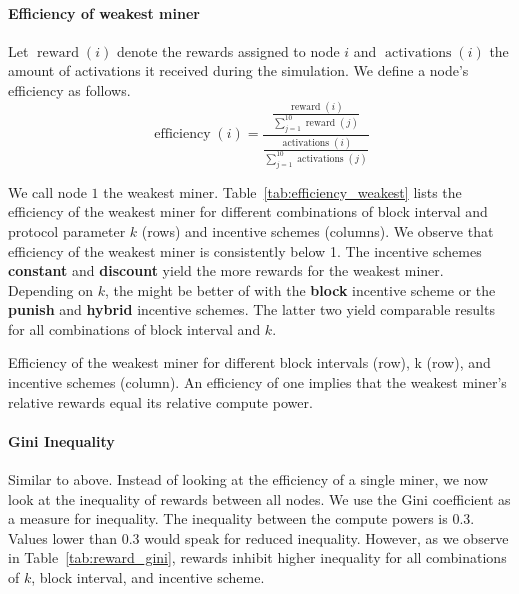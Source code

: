 \documentclass{article}
\begin{document}
\paragraph{Efficiency of weakest miner}

Let $\operatorname{reward}(i)$ denote the rewards assigned to node $i$ and $\operatorname{activations}(i)$ the amount of activations it received during the simulation.
We define a node's efficiency as follows.
\[
  \operatorname{efficiency}(i) =
  \frac{
    \frac{\operatorname{reward}(i)}{\sum_{j=1}^{10}{\operatorname{reward}(j)}}
    }{
    \frac{\operatorname{activations}(i)}{\sum_{j=1}^{10}{\operatorname{activations}(j)}}
  }
\]

We call node $1$ the weakest miner.
Table~\ref{tab:efficiency_weakest} lists the efficiency of the weakest miner for different combinations of block interval and protocol parameter $k$ (rows) and incentive schemes (columns). We observe that efficiency of the weakest miner is consistently below 1. The incentive schemes \textbf{constant} and \textbf{discount} yield the more rewards for the weakest miner. Depending on $k$, the might be better of with the \textbf{block} incentive scheme or the \textbf{punish} and \textbf{hybrid} incentive schemes. The latter two yield comparable results for all combinations of block interval and $k$.


\begin{table}
  \caption{Efficiency of the weakest miner for different block intervals (row), k (row), and incentive schemes (column). An efficiency of one implies that the weakest miner's relative rewards equal its relative compute power.}
  \label{tab:efficiency_weakest}
  
\end{table}

\paragraph{Gini Inequality}

Similar to above.
Instead of looking at the efficiency of a single miner, we now look at the inequality of rewards between all nodes.
We use the Gini coefficient as a measure for inequality.
The inequality between the compute powers is 0.3.
Values lower than 0.3 would speak for reduced inequality.
However, as we observe in Table~\ref{tab:reward_gini}, rewards inhibit higher inequality for all combinations of $k$, block interval, and incentive scheme.
\end{document}
